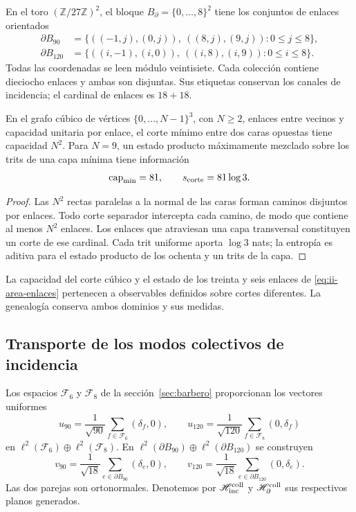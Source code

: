 En el toro \((\mathbb Z/27\mathbb Z)^2\), el bloque
\(B_\partial=\{0,\ldots,8\}^2\) tiene los conjuntos de enlaces
orientados
\begin{align}
 \partial B_{90}
 &=\{((-1,j),(0,j)),\ ((8,j),(9,j)):0\le j\le8\},\\
 \partial B_{120}
 &=\{((i,-1),(i,0)),\ ((i,8),(i,9)):0\le i\le8\}.
 \label{eq:ii-area-enlaces}
\end{align}
Todas las coordenadas se leen módulo veintisiete. Cada colección contiene
dieciocho enlaces y ambas son disjuntas. Sus etiquetas conservan los
canales de incidencia; el cardinal de enlaces es \(18+18\).

\begin{theorem}
\label{thm:ii-area-corte-minimo}
En el grafo cúbico de vértices \(\{0,\ldots,N-1\}^3\), con
\(N\ge2\), enlaces entre vecinos y capacidad unitaria por enlace,
el corte mínimo entre dos caras opuestas tiene capacidad \(N^2\).
Para \(N=9\), un estado producto máximamente mezclado sobre los
trits de una capa mínima tiene información
\begin{equation}
 \operatorname{cap}_{\min}=81,\qquad s_{\rm corte}=81\log3.
 \label{eq:ii-area-corte-informacion}
\end{equation}
\end{theorem}
\begin{proof}
Las \(N^2\) rectas paralelas a la normal de las caras forman caminos
disjuntos por enlaces. Todo corte separador intercepta cada camino, de
modo que contiene al menos \(N^2\) enlaces. Los enlaces que atraviesan
una capa transversal constituyen un corte de ese cardinal. Cada trit
uniforme aporta \(\log3\) nats; la entropía es aditiva para el estado
producto de los ochenta y un trits de la capa.
\end{proof}

La capacidad del corte cúbico y el estado de los treinta y seis enlaces
de \eqref{eq:ii-area-enlaces} pertenecen a observables definidos sobre
cortes diferentes. La genealogía conserva ambos dominios y sus medidas.

\subsection{Transporte de los modos colectivos de incidencia}
\label{sec:ii-area-transporte-colectivo}

Los espacios \(\mathcal F_6\) y \(\mathcal F_8\) de la
sección~\ref{sec:barbero} proporcionan los vectores uniformes
\[
 u_{90}=\frac1{\sqrt{90}}\sum_{f\in\mathcal F_6}(\delta_f,0),
 \qquad
 u_{120}=\frac1{\sqrt{120}}\sum_{f\in\mathcal F_8}(0,\delta_f)
\]
en \(\ell^2(\mathcal F_6)\oplus\ell^2(\mathcal F_8)\).
En \(\ell^2(\partial B_{90})\oplus\ell^2(\partial B_{120})\)
se construyen
\[
 v_{90}=\frac1{\sqrt{18}}\sum_{e\in\partial B_{90}}(\delta_e,0),
 \qquad
 v_{120}=\frac1{\sqrt{18}}\sum_{e\in\partial B_{120}}(0,\delta_e).
\]
Las dos parejas son ortonormales. Denotemos por
\(\mathscr H_{\rm inc}^{\rm coll}\) y
\(\mathscr H_\partial^{\rm coll}\) sus respectivos planos generados.

